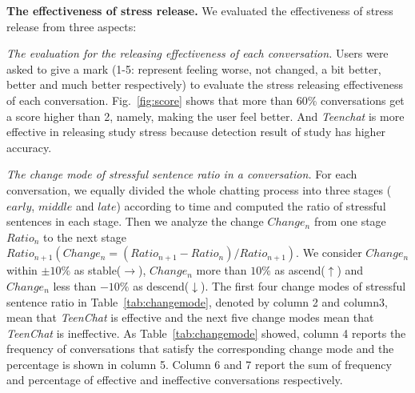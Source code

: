\textbf{The effectiveness of stress release. }
We evaluated the effectiveness of stress release from three aspects:

\textit{The evaluation for the releasing effectiveness of each conversation.}
Users were asked to give a mark (1-5: represent feeling worse, not changed, a bit better, better and much better respectively) to evaluate the stress releasing effectiveness of each conversation. Fig.~\ref{fig:score} shows that more than 60\% conversations get a score higher than 2, namely, making the user feel better. And \emph{Teenchat} is more effective in releasing study stress because detection result of study has higher accuracy.

\textit{The change mode of stressful sentence ratio in a conversation.}
For each conversation, we equally divided the whole chatting process into three stages ($early$, $middle$ and $late$) according to time and computed the ratio of stressful sentences in each stage. Then we analyze the change $Change_n$ from one stage $Ratio_n$ to the next stage $Ratio_{n+1} (Change_n=(Ratio_{n+1}-Ratio_n)/Ratio_{n+1})$. We consider $Change_n$ within $\pm10\%$ as stable($\rightarrow$), $Change_n$ more than $10\%$ as ascend($\uparrow$) and $Change_n$ less than $-10\%$ as descend($\downarrow$). The first four change modes of stressful sentence ratio in Table~\ref{tab:changemode}, denoted by column 2 and column3, mean that \emph{TeenChat} is effective  and the next five change modes mean that \emph{TeenChat} is ineffective. As  Table~\ref{tab:changemode} showed, column 4 reports the frequency of conversations that satisfy the corresponding change mode and the percentage is shown in column 5. Column 6 and 7 report the sum of frequency and percentage of effective and ineffective conversations respectively.
